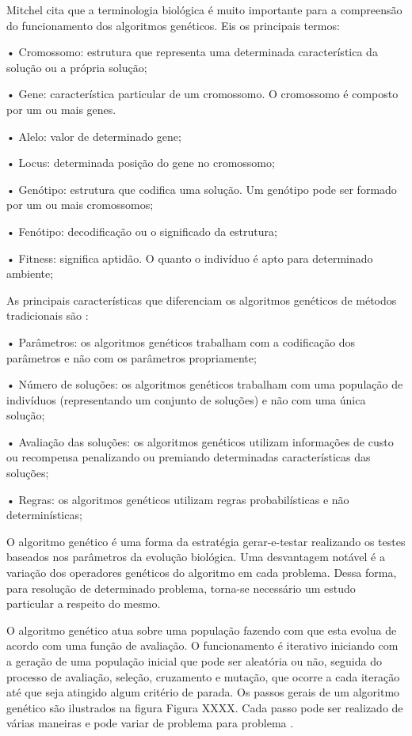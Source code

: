 Mitchel \cite{(Mitchel 1996)} cita que a terminologia biológica é muito importante para a compreensão do funcionamento dos algoritmos genéticos. Eis os principais termos: \par
•  Cromossomo: estrutura que representa uma determinada característica da solução ou a própria solução; \par
•  Gene: característica particular de um cromossomo. O cromossomo é composto por um ou mais genes. \par
•  Alelo: valor de determinado gene;\par
•  Locus: determinada posição do gene no cromossomo;\par
•  Genótipo: estrutura que codifica uma solução. Um genótipo pode ser formado por um ou mais cromossomos; \par
•  Fenótipo: decodificação ou o significado da estrutura; \par
•  Fitness: significa aptidão. O quanto o indivíduo é apto para determinado ambiente; \par
As principais características que diferenciam os algoritmos genéticos de métodos tradicionais são \cite{(Goldberg 1989)}: \par
•  Parâmetros: os algoritmos genéticos trabalham com a codificação dos parâmetros e não com os parâmetros propriamente; \par
•  Número de soluções: os algoritmos genéticos trabalham com uma população de indivíduos (representando um conjunto de soluções) e não com uma única solução; \par

•  Avaliação das soluções: os algoritmos genéticos utilizam informações de custo ou recompensa penalizando ou premiando determinadas características das soluções; \par

•  Regras: os algoritmos genéticos utilizam regras probabilísticas e não determinísticas; \par

O algoritmo genético é uma forma da estratégia gerar-e-testar realizando os testes baseados nos parâmetros da evolução biológica. Uma desvantagem notável é a variação dos operadores genéticos do algoritmo em cada problema. Dessa forma, para resolução de determinado problema, torna-se necessário um estudo particular a respeito do mesmo. \par

O algoritmo genético atua sobre uma população fazendo com que esta evolua de acordo com uma função de avaliação. O funcionamento é iterativo iniciando com a geração de uma população inicial que pode ser aleatória ou não, seguida do processo de avaliação, seleção, cruzamento e mutação, que ocorre a cada iteração até que seja atingido algum critério de parada. Os passos gerais de um algoritmo genético são ilustrados na figura 
Figura XXXX. Cada passo pode ser realizado de várias maneiras e pode variar de problema para problema \cite{Timóteo 2002}.\par 

